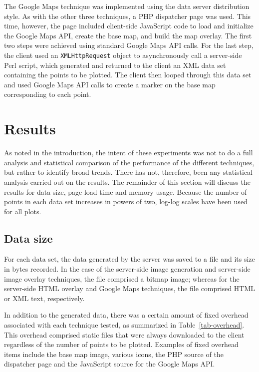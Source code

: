 \documentclass[acmnow]{acmtrans2m}
\begin{document}
The Google Maps technique was implemented using the data server
distribution style. As with the other three techniques, a PHP dispatcher
page was used. This time, however, the page included client-side
JavaScript code to load and initialize the Google Maps API, create the
base map, and build the map overlay. The first two steps were achieved
using standard Google Maps API calls. For the last step, the client used
an \texttt{XMLHttpRequest} object to asynchronously call a server-side
Perl script, which generated and returned to the client an XML data set
containing the points to be plotted. The client then looped through this
data set and used Google Maps API calls to create a marker on the base
map corresponding to each point.


\section{Results}
\label{sec-results}

As noted in the introduction, the intent of these experiments was not to
do a full analysis and statistical comparison of the performance of the
different techniques, but rather to identify broad trends. There has
not, therefore, been any statistical analysis carried out on the
results. The remainder of this section will discuss the results for data
size, page load time and memory usage. Because the number of points in
each data set increases in powers of two, log-log scales have been used
for all plots.


\subsection{Data size}

For each data set, the data generated by the server was saved to a file
and its size in bytes recorded. In the case of the server-side image
generation and server-side image overlay techniques, the file comprised
a bitmap image; whereas for the server-side HTML overlay and Google Maps
techniques, the file comprised HTML or XML text, respectively.

In addition to the generated data, there was a certain amount of fixed
overhead associated with each technique tested, as summarized in
Table~\ref{tab-overhead}. This overhead comprised static files that were
always downloaded to the client regardless of the number of points to be
plotted. Examples of fixed overhead items include the base map image,
various icons, the PHP source of the dispatcher page and the JavaScript
source for the Google Maps API.
\end{document}
